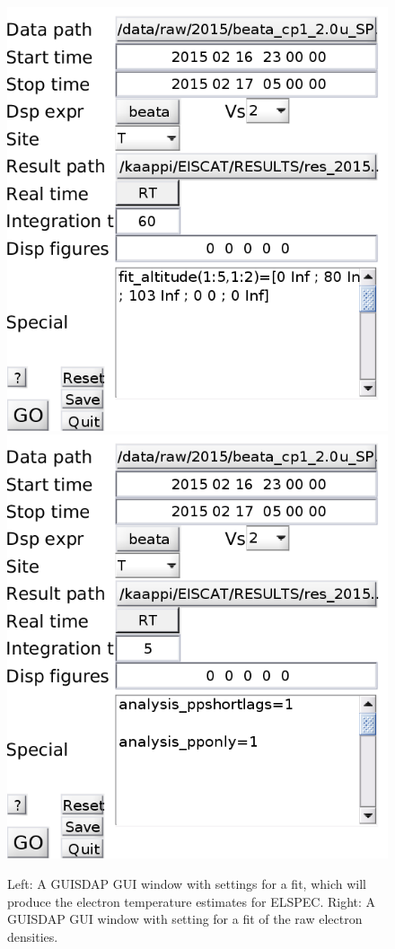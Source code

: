 \documentclass[12pt,a4paper]{report}
\begin{document}
\begin{figure}[ht]
\begin{center}
\includegraphics[width=.49\textwidth]{guisdap1.png}
\includegraphics[width=.49\textwidth]{guisdap2.png}
\caption{Left: A GUISDAP GUI window with settings for a fit, which will produce the electron temperature estimates for ELSPEC. Right: A GUISDAP GUI window with setting for a fit of the raw electron densities.}
\label{figGUISDAP}
\end{center}
\end{figure}
\end{document}
